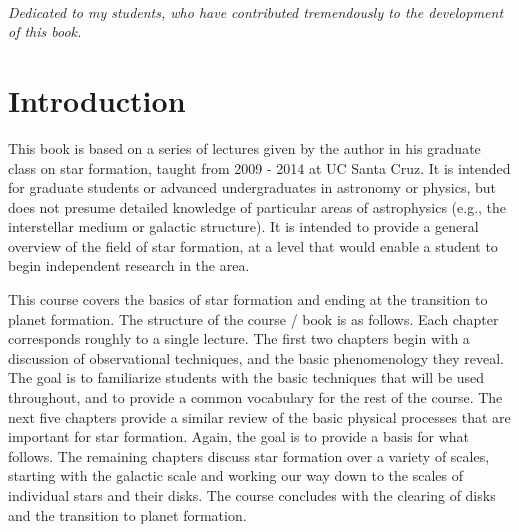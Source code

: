 \documentclass{tex/tufte-book} %
\begin{document}


\cleardoublepage
~\vfill
\begin{doublespace}
\noindent\fontsize{18}{22}\selectfont\itshape
\nohyphenation
Dedicated to my students, who have contributed tremendously to the development of this book.
\end{doublespace}
\vfill
\vfill


\cleardoublepage
\chapter*{Introduction} %

This book is based on a series of lectures given by the author in his graduate class on star formation, taught from 2009 - 2014 at UC Santa Cruz. It is intended for graduate students or advanced undergraduates in astronomy or physics, but does not presume detailed knowledge of particular areas of astrophysics (e.g., the interstellar medium or galactic structure). It is intended to provide a general overview of the field of star formation, at a level that would enable a student to begin independent research in the area.

This course covers the basics of star formation and ending at the transition to planet formation. The structure of the course / book is as follows. Each chapter corresponds roughly to a single lecture. The first two chapters begin with a discussion of observational techniques, and the basic phenomenology they reveal. The goal is to familiarize students with the basic techniques that will be used throughout, and to provide a common vocabulary for the rest of the course. The next five chapters provide a similar review of the basic physical processes that are important for star formation. Again, the goal is to provide a basis for what follows. The remaining chapters discuss star formation over a variety of scales, starting with the galactic scale and working our way down to the scales of individual stars and their disks. The course concludes with the clearing of disks and the transition to planet formation.
\end{document}
